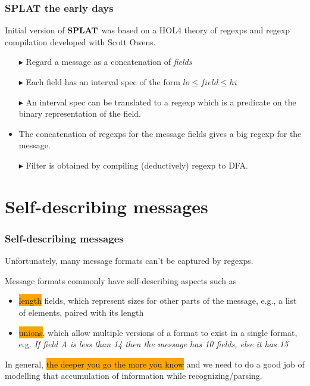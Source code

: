 \documentclass{beamer}
\newcommand{\kemph}[1]{\colorbox{orange}{#1}}
\newcommand{\konst}[1]{\ensuremath{\mbox{\bf{#1}}}}
\begin{document}
\begin{frame}[fragile]\frametitle{SPLAT the early days}

Initial version of \konst{SPLAT} was based on a HOL4 theory of regexps and regexp
compilation developed with Scott Owens.

\begin{itemize}[<+->]
\item [$\blacktriangleright$] Regard a message as a concatenation of \emph{fields}
\item [$\blacktriangleright$] Each field has an interval spec of the form $\mathit{lo} \leq \mathit{field} \leq \mathit{hi}$
\item [$\blacktriangleright$] An interval spec can be translated to a regexp which is a
  predicate on the binary representation of the field.
\item The concatenation of regexps for the message fields gives a big regexp for the message.
\item [$\blacktriangleright$] Filter is obtained by compiling (deductively) regexp to DFA.
\end{itemize}

\end{frame}

\section{Self-describing messages}

\begin{frame}[fragile]\frametitle{Self-describing messages}

Unfortunately, many message formats can't be captured by regexps.

Message formats commonly have self-describing aspects such as

\begin{itemize}

\item \kemph{length} fields, which represent sizes for other parts of
  the message, e.g., a list of elements, paired with its length

\item \kemph{unions}, which allow multiple versions of a format to
  exist in a single format, e.g.  \textit{If field A is less than 14
    then the message has 10 fields, else it has 15}

\end{itemize}

In general, \kemph{the deeper you go the more you know} and we need to
do a good job of modelling that accumulation of information while
recognizing/parsing.

\end{frame}
\end{document}
